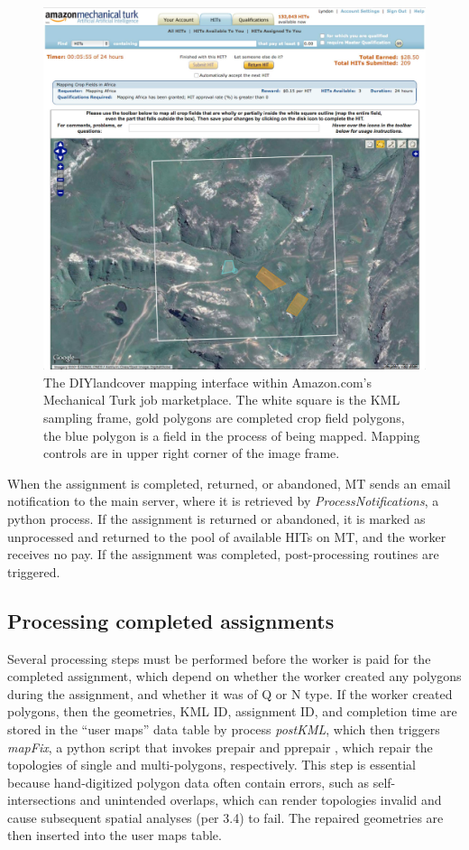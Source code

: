 \documentclass[preprint,12pt,authoryear]{elsarticle}
\begin{document}
\begin{figure}[!ht]
  \begin{center}
    \includegraphics[scale=0.85]{figures/fig3.pdf}
    \caption{The DIYlandcover mapping interface within Amazon.com's Mechanical Turk job marketplace. The white square is the KML sampling frame, gold polygons are completed crop field polygons, the blue polygon is a field in the process of being mapped. Mapping controls are in upper right corner of the image frame.}
    \label{default}
  \end{center}
\end{figure}

When the assignment is completed, returned, or abandoned, MT sends an email notification to the main server, where it is retrieved by \emph{ProcessNotifications}, a python process. If the assignment is returned or abandoned, it is marked as unprocessed and returned to the pool of available HITs on MT, and the worker receives no pay. If the assignment was completed, post-processing routines are triggered. 

\subsection{Processing completed assignments}
Several processing steps must be performed before the worker is paid for the completed assignment, which depend on whether the worker created any polygons during the assignment, and whether it was of Q or N type. If the worker created polygons, then the geometries, KML ID, assignment ID, and completion time are stored in the ``user maps'' data table by process \emph{postKML}, which then triggers \emph{mapFix}, a python script that invokes prepair and pprepair \citep{ohori_validation_2012}, which repair the topologies of single and multi-polygons, respectively. This step is essential because hand-digitized polygon data often contain errors, such as self-intersections and unintended overlaps, which can render topologies invalid and cause subsequent spatial analyses (per 3.4) to fail.  The repaired geometries are then inserted into the user maps table.  
\end{document}
